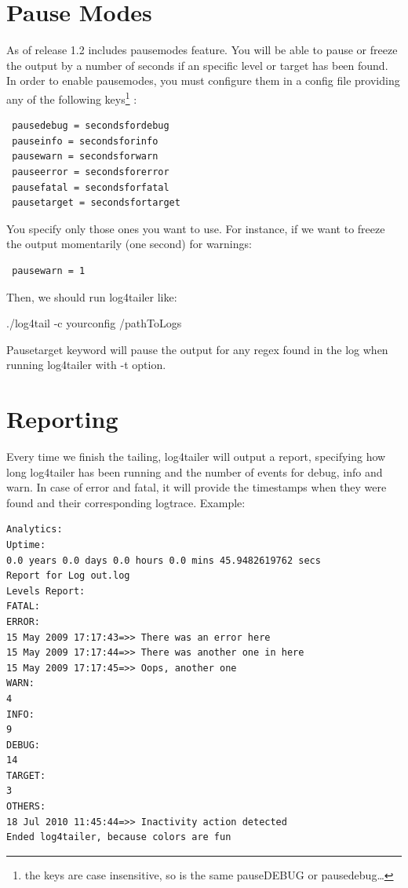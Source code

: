 \section{Pause Modes}
\label{sec:PauseModes}
As of release 1.2 \logftailer{} includes pausemodes feature. You will be able
to pause or freeze the output by a number of seconds if an specific level or
target has been found. In order to enable pausemodes, you must configure them
in a config file providing any of the following keys\footnote{the keys are case
insensitive, so is the same pauseDEBUG or pausedebug\ldots} :

\begin{config}
\begin{verbatim}
 pausedebug = secondsfordebug
 pauseinfo = secondsforinfo
 pausewarn = secondsforwarn
 pauseerror = secondsforerror
 pausefatal = secondsforfatal
 pausetarget = secondsfortarget
\end{verbatim}
\end{config}

\noindent
You specify only those ones you want to use.
For instance, if we want to freeze the output momentarily (one second) for warnings:

\begin{config}
\begin{verbatim}
 pausewarn = 1
\end{verbatim}
\end{config}

\noindent
Then, we should run log4tailer like:
\begin{cmd}
./log4tail -c yourconfig /pathToLogs
\end{cmd}
Pausetarget keyword will pause the output for any regex found in the log when
running log4tailer with -t option.

\section{Reporting}
Every time we finish the tailing, log4tailer will output a report, specifying
how long log4tailer has been running and the number of events for debug, info
and warn. In case of error and fatal, it will provide the timestamps when they
were found and their corresponding logtrace.  Example:

\begin{verbatim}
Analytics: 
Uptime: 
0.0 years 0.0 days 0.0 hours 0.0 mins 45.9482619762 secs 
Report for Log out.log
Levels Report: 
FATAL:
ERROR:
15 May 2009 17:17:43=>> There was an error here
15 May 2009 17:17:44=>> There was another one in here
15 May 2009 17:17:45=>> Oops, another one
WARN:
4
INFO:
9
DEBUG:
14
TARGET:
3
OTHERS:
18 Jul 2010 11:45:44=>> Inactivity action detected
Ended log4tailer, because colors are fun
\end{verbatim}

